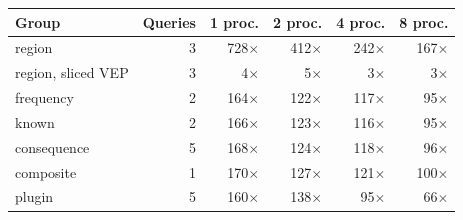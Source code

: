 \begin{tabular}{lrrrrr}
\toprule
Group & Queries & 1 proc. & 2 proc. & 4 proc. & 8 proc. \\
\midrule
region & 3 & 728$\times$ & 412$\times$ & 242$\times$ & 167$\times$ \\
region, sliced VEP & 3 & 4$\times$ & 5$\times$ & 3$\times$ & 3$\times$ \\
frequency & 2 & 164$\times$ & 122$\times$ & 117$\times$ & 95$\times$ \\
known & 2 & 166$\times$ & 123$\times$ & 116$\times$ & 95$\times$ \\
consequence & 5 & 168$\times$ & 124$\times$ & 118$\times$ & 96$\times$ \\
composite & 1 & 170$\times$ & 127$\times$ & 121$\times$ & 100$\times$ \\
plugin & 5 & 160$\times$ & 138$\times$ & 95$\times$ & 66$\times$ \\
\bottomrule
\end{tabular}
